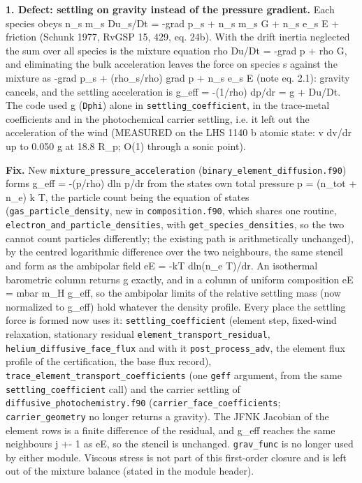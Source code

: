 \documentclass[english,a4paper]{my_memo}
\begin{document}
\textbf{1. Defect: settling on gravity instead of the pressure gradient.} Each
species obeys n\_s m\_s Du\_s/Dt = -grad p\_s + n\_s m\_s G + n\_s e\_s E + friction
(Schunk 1977, RvGSP 15, 429, eq. 24b). With the drift inertia neglected the
sum over all species is the mixture equation rho Du/Dt = -grad p + rho G, and
eliminating the bulk acceleration leaves the force on species s against the
mixture as -grad p\_s + (rho\_s/rho) grad p + n\_s e\_s E (note eq. 2.1): gravity
cancels, and the settling acceleration is g\_eff = -(1/rho) dp/dr = g + Du/Dt.
The code used g (\texttt{Dphi}) alone in \texttt{settling\_coefficient}, in the trace-metal
coefficients and in the photochemical carrier settling, i.e. it left out the
acceleration of the wind (MEASURED on the LHS 1140 b atomic state:
v dv/dr up to 0.050 g at 18.8 R\_p; O(1) through a sonic point).

\textbf{Fix.} New \texttt{mixture\_pressure\_acceleration} (\texttt{binary\_element\_diffusion.f90})
forms g\_eff = -(p/rho) dln p/dr from the state\textquotesingle s own total pressure
p = (n\_tot + n\_e) k T, the particle count being the equation of state\textquotesingle s
(\texttt{gas\_particle\_density}, new in \texttt{composition.f90}, which shares one routine,
\texttt{electron\_and\_particle\_densities}, with \texttt{get\_species\_densities}, so the two
cannot count particles differently; the existing path is arithmetically
unchanged), by the centred logarithmic difference over the two neighbours,
the same stencil and form as the ambipolar field eE = -kT dln(n\_e T)/dr. An
isothermal barometric column returns g exactly, and in a column of uniform
composition eE = mbar m\_H g\_eff, so the ambipolar limits of the relative
settling mass (now normalized to g\_eff) hold whatever the density profile.
Every place the settling force is formed now uses it:
\texttt{settling\_coefficient} (element step, fixed-wind relaxation, stationary
residual \texttt{element\_transport\_residual}, \texttt{helium\_diffusive\_face\_flux} and with
it \texttt{post\_process\_adv}, the element flux profile of the certification, the
base flux record), \texttt{trace\_element\_transport\_coefficients} (one \texttt{geff}
argument, from the same \texttt{settling\_coefficient} call) and the carrier
settling of \texttt{diffusive\_photochemistry.f90} (\texttt{carrier\_face\_coefficients};
\texttt{carrier\_geometry} no longer returns a gravity). The JFNK Jacobian of the
element rows is a finite difference of the residual, and g\_eff reaches the
same neighbours j +- 1 as eE, so the stencil is unchanged. \texttt{grav\_func} is no
longer used by either module. Viscous stress is not part of this
first-order closure and is left out of the mixture balance (stated in the
module header).
\end{document}
